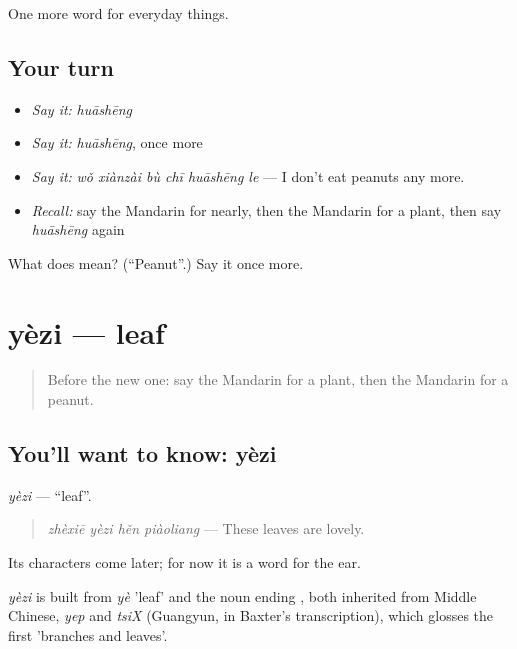 \begin{grammarlens}[title={What you've built}]
One more word for everyday things.
\end{grammarlens}

\subsection*{Your turn}
\begin{itemize}
\raggedright
  \item \emph{Say it:} \emph{huāshēng}
  \item \emph{Say it:} \emph{huāshēng}, once more
  \item \emph{Say it:} \emph{wǒ xiànzài bù chī huāshēng le} — I don't eat peanuts any more.
  \item \emph{Recall:} say the Mandarin for nearly, then the Mandarin for a plant, then say \emph{huāshēng} again
\end{itemize}

\begin{tcolorbox}[breakable,colback=teal!4,colframe=teal!35!black,title={Before you move on}]
What does  mean? (\textquotedblleft{}Peanut\textquotedblright{}.) Say it once more.
\end{tcolorbox}
\section[yèzi]{yèzi — leaf}

\label{lesson:ZH-C237-yezi}



\begin{quote}
Before the new one: say the Mandarin for a plant, then the Mandarin for a peanut.
\end{quote}

\subsection*{You'll want to know: yèzi}
\emph{yèzi} — \textquotedblleft{}leaf\textquotedblright{}.

\begin{quote}
\emph{zhèxiē yèzi hěn piàoliang} — These leaves are lovely.
\end{quote}

Its characters come later; for now it is a word for the ear.

\begin{cousinweb}
\emph{yèzi} is built from \emph{yè} 'leaf' and the noun ending , both inherited from Middle Chinese, \emph{yep} and \emph{tsiX} (Guangyun, in Baxter's transcription), which glosses the first 'branches and leaves'.
\end{cousinweb}

